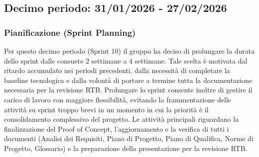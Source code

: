 \documentclass[a4paper, 11pt, oneside]{scrartcl} %
\begin{document}

\newpage


\subsection{Decimo periodo: 31/01/2026 - 27/02/2026}

\subsubsection*{Pianificazione (Sprint Planning)}

Per questo decimo periodo (Sprint 10) il gruppo ha deciso di prolungare la durata dello sprint dalle consuete 2 settimane a 4 settimane. Tale scelta è motivata dal ritardo accumulato nei periodi precedenti, dalla necessità di completare la baseline tecnologica e dalla volontà di portare a termine tutta la documentazione necessaria per la revisione RTB. Prolungare lo sprint consente inoltre di gestire il carico di lavoro con maggiore flessibilità, evitando la frammentazione delle attività su sprint troppo brevi in un momento in cui la priorità è il consolidamento complessivo del progetto. Le attività principali riguardano la finalizzazione del Proof of Concept, l'aggiornamento e la verifica di tutti i documenti (Analisi dei Requisiti, Piano di Progetto, Piano di Qualifica, Norme di Progetto, Glossario) e la preparazione della presentazione per la revisione RTB.
\end{document}

